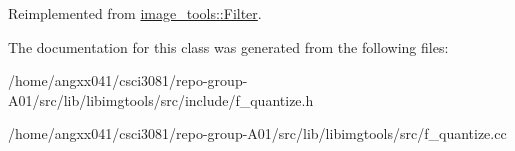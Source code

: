 Reimplemented from \hyperlink{classimage__tools_1_1Filter_afd5d1be5736e343077d331896d4130d9}{image\+\_\+tools\+::\+Filter}.



The documentation for this class was generated from the following files\+:\begin{DoxyCompactItemize}
\item 
/home/angxx041/csci3081/repo-\/group-\/\+A01/src/lib/libimgtools/src/include/f\+\_\+quantize.\+h\item 
/home/angxx041/csci3081/repo-\/group-\/\+A01/src/lib/libimgtools/src/f\+\_\+quantize.\+cc\end{DoxyCompactItemize}
